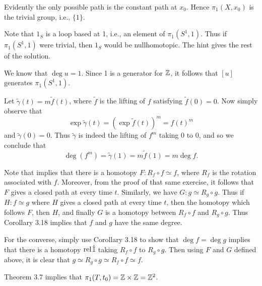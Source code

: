 \documentclass[../../solutions.tex]{subfiles}
\begin{document}
\begin{exercise} \leavevmode
Evidently the only possible path is the constant path at $x_0$. Hence $\pi_1(X,x_0)$ is the trivial group, i.e., $\{1\}$. 
\end{exercise}

\begin{exercise} \leavevmode
Note that $1_S$ is a loop based at 1, i.e., an element of $\pi_1(S^1,1)$. 
Thus if $\pi_1(S^1,1)$ were trivial, then $1_S$ would be nullhomotopic. 
The hint gives the rest of the solution. 
\end{exercise}

\begin{exercise} \leavevmode
We know that $\deg u=1$. 
Since 1 is a generator for $\mathbb{Z}$, it follows that $[u]$ generates $\pi_1(S^1,1)$. 
\end{exercise}

\begin{exercise} \leavevmode
Let $\tilde\gamma(t)=m\tilde f(t)$, where $\tilde f$ is the lifting of $f$ satisfying $\tilde f(0)=0$. 
Now simply observe that \[\exp\tilde\gamma(t)=\left(\exp\tilde f(t)\right)^m=f(t)^m\] and $\tilde\gamma(0)=0$. 
Thus $\tilde\gamma$ is indeed the lifting of $f^m$ taking 0 to 0, and so we conclude that \[\deg(f^m)=\tilde\gamma(1)=m\tilde f(1)=m\deg f.\]
\end{exercise}

\begin{exercise} \leavevmode
Note that  implies that there is a homotopy $F:R_f\circ f\simeq f$, where $R_f$ is the rotation associated with $f$. 
Moreover, from the proof of that same exercise, it follows that $F$ gives a closed path at every time $t$. 
Similarly, we have $G:g\simeq R_g\circ g$. 
Thus if $H:f\simeq g$ where $H$ gives a closed path at every time $t$, then the homotopy which follows $F$, then $H$, and finally $G$ is a homotopy between $R_f\circ f$ and $R_g\circ g$. 
Thus Corollary 3.18 implies that $f$ and $g$ have the same degree. 

For the converse, simply use Corollary 3.18 to show that $\deg f=\deg g$ implies that there is a homotopy $\operatorname{rel}\dot{\mathbb I}$ taking $R_f\circ f$ to $R_g\circ g$. 
Then using $F$ and $G$ defined above, it is clear that $g\simeq R_g\circ g\simeq R_f\circ f\simeq f$. 
\end{exercise}

\begin{exercise} \leavevmode
Theorem 3.7 implies that $\pi_1(T,t_0)=\mathbb{Z}\times\mathbb{Z}=\mathbb{Z}^2$. 
\end{exercise}
\end{document}
